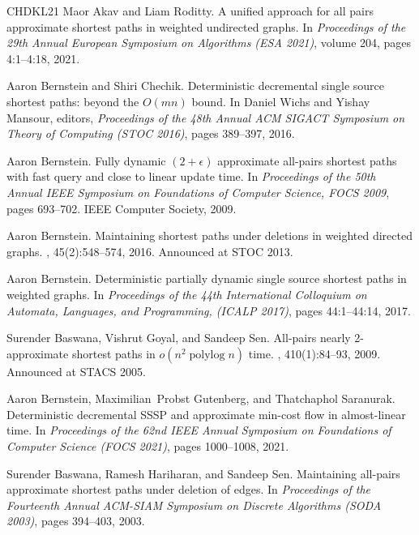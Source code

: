\documentclass[11pt]{article}
\theoremstyle{definition}
\theoremstyle{remark}
\begin{document}
\begin{thebibliography}{CHDKL21}
Maor Akav and Liam Roditty.
\newblock A unified approach for all pairs approximate shortest paths in
  weighted undirected graphs.
\newblock In {\em Proceedings of the 29th Annual European Symposium on
  Algorithms ({ESA} 2021)}, volume 204, pages 4:1--4:18, 2021.

Aaron Bernstein and Shiri Chechik.
\newblock Deterministic decremental single source shortest paths: beyond the
  {$O(mn)$} bound.
\newblock In Daniel Wichs and Yishay Mansour, editors, {\em Proceedings of the
  48th Annual {ACM} {SIGACT} Symposium on Theory of Computing ({STOC} 2016)},
  pages 389--397, 2016.

Aaron Bernstein.
\newblock Fully dynamic $(2 + \epsilon)$ approximate all-pairs shortest paths
  with fast query and close to linear update time.
\newblock In {\em Proceedings of the 50th Annual {IEEE} Symposium on
  Foundations of Computer Science, {FOCS} 2009}, pages 693--702. {IEEE}
  Computer Society, 2009.

Aaron Bernstein.
\newblock Maintaining shortest paths under deletions in weighted directed
  graphs.
, 45(2):548--574, 2016.
\newblock Announced at {STOC} 2013.

Aaron Bernstein.
\newblock Deterministic partially dynamic single source shortest paths in
  weighted graphs.
\newblock In {\em Proceedings of the 44th International Colloquium on Automata,
  Languages, and Programming, ({ICALP} 2017)}, pages 44:1--44:14, 2017.

Surender Baswana, Vishrut Goyal, and Sandeep Sen.
\newblock All-pairs nearly 2-approximate shortest paths in
  $o(n^2\operatorname{polylog}n)$ time.
, 410(1):84--93, 2009.
\newblock Announced at {STACS} 2005.

Aaron Bernstein, Maximilian~Probst Gutenberg, and Thatchaphol Saranurak.
\newblock Deterministic decremental {SSSP} and approximate min-cost flow in
  almost-linear time.
\newblock In {\em Proceedings of the 62nd {IEEE} Annual Symposium on
  Foundations of Computer Science ({FOCS} 2021)}, pages 1000--1008, 2021.

Surender Baswana, Ramesh Hariharan, and Sandeep Sen.
\newblock Maintaining all-pairs approximate shortest paths under deletion of
  edges.
\newblock In {\em Proceedings of the Fourteenth Annual {ACM-SIAM} Symposium on
  Discrete Algorithms ({SODA} 2003)}, pages 394--403, 2003.


\end{thebibliography}
\end{document}

